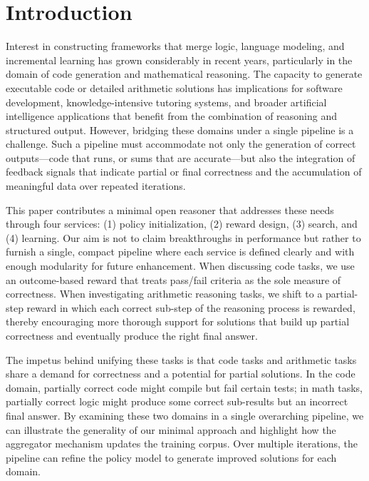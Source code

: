 \documentclass{article}
\begin{document}
\section{Introduction}
Interest in constructing frameworks that merge logic, language modeling, and incremental learning has grown considerably in recent years, particularly in the domain of code generation and mathematical reasoning. The capacity to generate executable code or detailed arithmetic solutions has implications for software development, knowledge-intensive tutoring systems, and broader artificial intelligence applications that benefit from the combination of reasoning and structured output. However, bridging these domains under a single pipeline is a challenge. Such a pipeline must accommodate not only the generation of correct outputs—code that runs, or sums that are accurate—but also the integration of feedback signals that indicate partial or final correctness and the accumulation of meaningful data over repeated iterations.

This paper contributes a minimal open reasoner that addresses these needs through four services: (1) policy initialization, (2) reward design, (3) search, and (4) learning. Our aim is not to claim breakthroughs in performance but rather to furnish a single, compact pipeline where each service is defined clearly and with enough modularity for future enhancement. When discussing code tasks, we use an outcome-based reward that treats pass/fail criteria as the sole measure of correctness. When investigating arithmetic reasoning tasks, we shift to a partial-step reward in which each correct sub-step of the reasoning process is rewarded, thereby encouraging more thorough support for solutions that build up partial correctness and eventually produce the right final answer.

The impetus behind unifying these tasks is that code tasks and arithmetic tasks share a demand for correctness and a potential for partial solutions. In the code domain, partially correct code might compile but fail certain tests; in math tasks, partially correct logic might produce some correct sub-results but an incorrect final answer. By examining these two domains in a single overarching pipeline, we can illustrate the generality of our minimal approach and highlight how the aggregator mechanism updates the training corpus. Over multiple iterations, the pipeline can refine the policy model to generate improved solutions for each domain.
\end{document}
